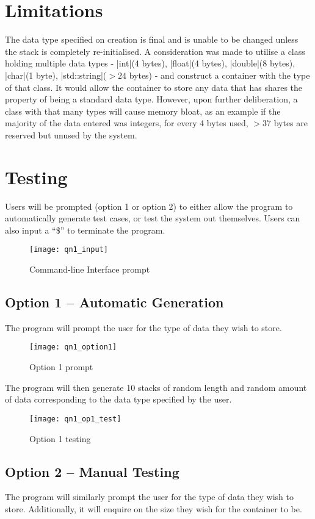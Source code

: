 \documentclass{report}
\begin{document}
\section{Limitations}
The data type specified on creation is final and is unable to be changed unless the stack is completely re-initialised. A consideration was made to utilise a class holding multiple data types - |int|(4 bytes), |float|(4 bytes), |double|(8 bytes), |char|(1 byte), |std::string|(\(>24\) bytes) - and construct a container with the type of that class. It would allow the container to store any data that has shares the property of being a standard data type. However, upon further deliberation, a class with that many types will cause memory bloat, as an example if the majority of the data entered was integers, for every 4 bytes used, \(>37\) bytes are reserved but unused by the system.
\section{Testing}
Users will be prompted (option 1 or option 2) to either allow the program to automatically generate test cases, or test the system out themselves. Users can also input a ``\$'' to terminate the program.
\begin{figure}[H]
	\centering
	\caption{Command-line Interface prompt}
	\texttt{[image: qn1\_input]}
	\label{fig:qn1_prompt}
\end{figure}
\subsection{Option 1 -- Automatic Generation}
The program will prompt the user for the type of data they wish to store.
\begin{figure}[H]
	\centering
	\caption{Option 1 prompt}
	\texttt{[image: qn1\_option1]}
	\label{fig:qn1_op1}
\end{figure}
The program will then generate 10 stacks of random length and random amount of data corresponding to the data type specified by the user.

\begin{figure}[H]
	\centering
	\caption{Option 1 testing}
	\texttt{[image: qn1\_op1\_test]}
	\label{fig:qn1_op1_test}
\end{figure}
\subsection{Option 2 -- Manual Testing}
The program will similarly prompt the user for the type of data they wish to store. Additionally, it will enquire on the size they wish for the container to be.
\end{document}

